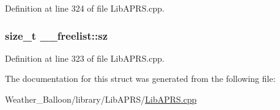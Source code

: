 Definition at line 324 of file Lib\+A\+P\+R\+S.\+cpp.

\subsubsection[{\texorpdfstring{sz}{sz}}]{\setlength{\rightskip}{0pt plus 5cm}size\+\_\+t \+\_\+\+\_\+freelist\+::sz}\hypertarget{struct____freelist_a400b91c9baf14861360a1c1caba8309d}{}\label{struct____freelist_a400b91c9baf14861360a1c1caba8309d}


Definition at line 323 of file Lib\+A\+P\+R\+S.\+cpp.



The documentation for this struct was generated from the following file\+:\begin{DoxyCompactItemize}
\item 
Weather\+\_\+\+Balloon/library/\+Lib\+A\+P\+R\+S/\hyperlink{_lib_a_p_r_s_8cpp}{Lib\+A\+P\+R\+S.\+cpp}\end{DoxyCompactItemize}
